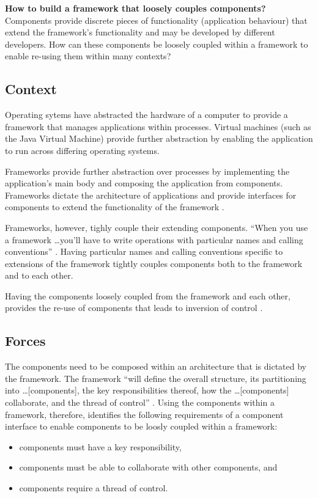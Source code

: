 \documentclass[prodmode]{style/acmlarge}
\begin{document}
\textbf{How to build a framework that loosely couples components?} Components
provide discrete pieces of functionality (application behaviour) that extend the
framework's functionality and may be developed by different developers.  How can
these components be loosely coupled within a framework to enable re-using them
within many contexts?


\subsection{Context}

Operating sytems have abstracted the hardware of a computer to provide a
framework that manages applications within processes.  Virtual machines (such as
the Java Virtual Machine) provide further abstraction by enabling the
application to run across differing operating systems.

Frameworks provide further abstraction over processes by implementing the
application's main body and composing the application from components. 
Frameworks dictate the architecture of applications and provide interfaces for
components to extend the functionality of the framework \cite{gof}.

Frameworks, however, tighly couple their extending components.  ``When you use a
framework \ldots you'll have to write operations with particular names and
calling conventions'' \cite[p. 27]{gof}.  Having particular names and calling
conventions specific to extensions of the framework  tightly couples components
both to the framework and to each other.

Having the components loosely coupled from the framework and each other,
provides the re-use of components that leads to inversion of control \cite{gof}.


\subsection{Forces}

The components need to be composed within an architecture that is dictated by
the framework.  The framework ``will define the overall structure, its
partitioning into \ldots [components], the key responsibilities thereof, how the
\ldots [components] collaborate, and the thread of control'' \cite[p.26]{gof}.
Using the components within a framework, therefore, identifies the following
requirements of a component interface to enable components to be loosly coupled
within a framework:
\begin{itemize}
  \item components must have a key responsibility,
  \item components must be able to collaborate with other components, and
  \item components require a thread of control.
\end{itemize}
\end{document}
